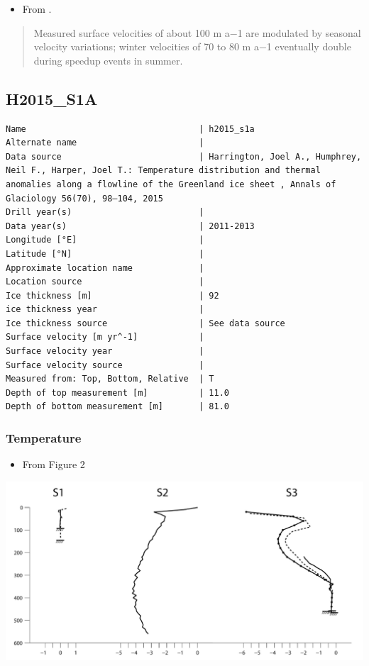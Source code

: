 \documentclass[article,a4paper,times,11pt,twoside]{article}
\begin{document}
\begin{itemize}
\item From \textcite{ryser_2014_caterpillar}.
\end{itemize}

\begin{quote}
Measured surface velocities of about 100 m a−1 are
modulated by seasonal velocity variations; winter
velocities of 70 to 80 m a−1 eventually double during
speedup events in summer. 
\end{quote}
\clearpage
\subsection{H2015\_S1A}
\label{sec:org03b8421}
\begin{verbatim}
Name                                  | h2015_s1a
Alternate name                        | 
Data source                           | Harrington, Joel A., Humphrey, Neil F., Harper, Joel T.: Temperature distribution and thermal anomalies along a flowline of the Greenland ice sheet , Annals of Glaciology 56(70), 98–104, 2015 
Drill year(s)                         | 
Data year(s)                          | 2011-2013
Longitude [°E]                        | 
Latitude [°N]                         | 
Approximate location name             | 
Location source                       | 
Ice thickness [m]                     | 92
ice thickness year                    | 
Ice thickness source                  | See data source
Surface velocity [m yr^-1]            | 
Surface velocity year                 | 
Surface velocity source               | 
Measured from: Top, Bottom, Relative  | T
Depth of top measurement [m]          | 11.0
Depth of bottom measurement [m]       | 81.0
\end{verbatim}

\subsubsection{Temperature}
\label{sec:org2f02c46}

\begin{itemize}
\item From \textcite{harrington_2015} Figure 2
\end{itemize}

\begin{center}
\includegraphics[width=.9\linewidth]{h2015_s1a/harrington_2015_fig2_S1_S2_S3.png}
\end{center}
\end{document}
